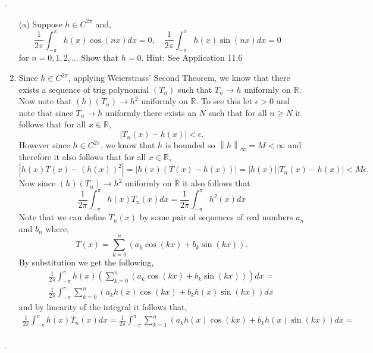 \documentclass[12pt]{article}
\makeatletter
\theoremstyle{ex215}
\newcounter{probcount}
\newlength\probsep
\newlength\pshrinking
\newenvironment{problems}%
  {\ifhmode\unskip\par\fi\setcounter{probcount}{0}\probsep\parskip
  \sbox\@tempboxa{\textbf{9.}}\pshrinking\wd\@tempboxa\advance\pshrinking\labelsep
  \advance\linewidth -\pshrinking
  \advance\@totalleftmargin\pshrinking
  \advance\leftskip\pshrinking}%
  {\ifhmode\unskip \par\fi\advance\leftskip-\pshrinking}%
\renewenvironment{proof}[1][\proofname]{\par
  \pushQED{\qed}%
  \normalfont \topsep6\p@\@plus6\p@\relax
  \trivlist
  \@topsep \topsep
  \item[\hskip\labelsep
        \itshape
    #1\@addpunct{.}]\ignorespaces
}{%
  \popQED\endtrivlist\@endpefalse
}
\newcommand{\Reals}{\ensuremath{\mathbb R}}
\newcommand{\norm}[2]{\left \lVert #1 \right \rVert_{#2}}
\let\RR\Reals
\makeatother
\begin{document}
\begin{problems}
\begin{enumerate}
  \item[(a)] Suppose $h \in C^{2\pi}$ and, 
  \begin{equation*}
    \frac{1}{2\pi} \int_{-\pi}^\pi h(x) \cos(nx) dx = 0, \quad  \frac{1}{2\pi} \int_{-\pi}^\pi h(x) \sin(nx) dx = 0 \quad 
  \end{equation*}
  for $n = 0, 1, 2, \dots$ Show that $h = 0$. Hint: See Application 11.6
  \begin{proof} Since $h \in C^{2\pi}$, applying Weierstrass' Second Theorem, we know that there exists a sequence of trig polynomial $(T_n)$ such that $T_n \to h$ uniformly on $\RR$. Now note that $(h)(T_n) \to h^2$ uniformly on $\RR$. To see this let $\epsilon > 0$ and note that since $T_n \to h$ uniformly there exists an $N$ such that for all $n \geq N$ it follows that for all $x \in \RR$,
    \begin{equation*}
      |T_n(x) - h(x)| < \epsilon.
    \end{equation*}
      However since $h \in C^{2\pi}$, we know that $h$ is bounded so $\norm{h}{\infty} = M < \infty$ and therefore it also follows that for all $x \in \RR$,
    \begin{equation*}
      |h(x)T(x) - (h(x))^2| = |h(x)(T(x) - h(x))| = |h(x)||T_n(x) - h(x)| < M\epsilon. 
    \end{equation*} 
    Now since  $(h)(T_n) \to h^2$ uniformly on $\RR$ it also follows that 
    \begin{equation*}
      \frac{1}{2\pi}\int_{-\pi}^{\pi} h(x)T_n(x)dx = \frac{1}{2\pi}\int_{-\pi}^{\pi} h^2(x)dx
    \end{equation*}
    Note that we can define $T_n(x)$ by some pair of sequences of real numbers $a_n$ and $b_n$
    where,
    \begin{equation*}
      T(x) = \sum_{k = 0}^n\left(a_k \cos(kx) + b_k\sin(kx)\right).
    \end{equation*}
    By substitution we get the following, 
      \begin{multline*}  
        \frac{1}{2\pi}\int_{-\pi}^{\pi} h(x)\left(\sum_{k = 0}^n\left(a_k \cos(kx) + b_k\sin(kx)\right)\right)dx=\\  \frac{1}{2\pi}\int_{-\pi}^{\pi} \sum_{k = 0}^n\left(a_k h(x)\cos(kx) + b_kh(x)\sin(kx)\right)dx
      \end{multline*}
      and by linearity of the integral it follows that, 
      \begin{multline*}
        \frac{1}{2\pi}\int_{-\pi}^{\pi} h(x)T_n(x)dx = \frac{1}{2\pi}\int_{-\pi}^{\pi}\sum_{k = 1}^n\left(a_k h(x)\cos(kx) + b_kh(x)\sin(kx)\right)dx =\\

\end{multline*}
\end{proof}
\end{enumerate}
\end{problems}
\end{document}
